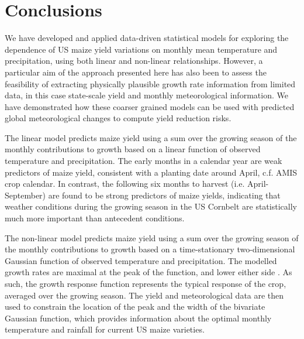 \documentclass[12pt]{iopart}
\newcommand{\remove}[1]{}
\newcommand{\add}[1]{#1}
\begin{document}
\section{Conclusions}
\label{sec:conclusions}
We have developed and applied data-driven statistical models for exploring the dependence of US maize yield variations on monthly mean temperature and precipitation\add{, using both linear and non-linear relationships}. \remove{This approach shares some similarities with previous statistical crop models \citep[e.g.][]{wang:1998, schlenker:2009, lobell:2010,  welch:2010, roberts:2012, lobell:2013, zhou:2018} and \cite{snyder:2018} who developed emulators of simulated crop yields based on the Agricultural Model Intercomparison and Improvement Project (AgMIP) Coordinated Climate-Crop Modeling Project (C3MP) data.} However, a particular aim of the approach presented here has also been to assess the feasibility of extracting physically plausible growth rate information from limited data, in this case state-scale yield and monthly meteorological information. \add{We have demonstrated how these coarser grained models can be used with predicted global meteorological changes to compute yield reduction risks.}

\add{The linear model predicts maize yield using a sum over the growing season of the monthly contributions to growth based on a linear function of observed temperature and precipitation.} \remove{Based on linear models, the}\add{The} early months in a calendar year are weak predictors of maize yield, consistent with a planting date around April, c.f. AMIS crop calendar. In contrast, the following six months to harvest (i.e. April-September) are found to be strong predictors of maize yields\remove{ in the US Cornbelt}, indicating that weather conditions during the growing season\add{ in the US Cornbelt} are statistically much more important than antecedent conditions.

\add{The non-linear model predicts maize yield using a sum over the growing season of the monthly contributions to growth based on a time-stationary two-dimensional Gaussian function of observed temperature and precipitation.} \remove{To test the ability of the approach to extract maize yield response to temperature and rainfall using minimal data, we assume monthly maize growth rates are captured by a time-stationary two-dimensional Gaussian function of temperature and precipitation.} \remove{in which} \add{The modelled} growth rates are maximal at the peak of the function, and lower either side \citep[c.f.][]{cutforth:1990, wang:1998,  streck:2007, hatfield:2015, korres:2016, tigchelaar:2018}. As such, the growth response function represents the typical response of the crop, averaged over the growing season. The yield and meteorological data are then used to constrain the location of the peak and the width of the bivariate Gaussian function\add{, which provides information about the optimal monthly temperature and rainfall for current US maize varieties.} 
\end{document}
